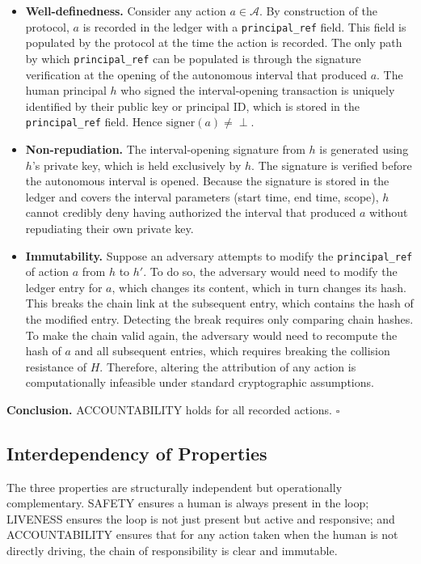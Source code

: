 \begin{itemize}
    \item \textbf{Well-definedness.} Consider any action $a \in \mathcal{A}$. By construction of the protocol, $a$ is recorded in the ledger with a \texttt{principal\_ref} field. This field is populated by the protocol at the time the action is recorded. The only path by which \texttt{principal\_ref} can be populated is through the signature verification at the opening of the autonomous interval that produced $a$. The human principal $h$ who signed the interval-opening transaction is uniquely identified by their public key or principal ID, which is stored in the \texttt{principal\_ref} field. Hence $\text{signer}(a) \neq \perp$.
    \item \textbf{Non-repudiation.} The interval-opening signature from $h$ is generated using $h$'s private key, which is held exclusively by $h$. The signature is verified before the autonomous interval is opened. Because the signature is stored in the ledger and covers the interval parameters (start time, end time, scope), $h$ cannot credibly deny having authorized the interval that produced $a$ without repudiating their own private key.
    \item \textbf{Immutability.} Suppose an adversary attempts to modify the \texttt{principal\_ref} of action $a$ from $h$ to $h'$. To do so, the adversary would need to modify the ledger entry for $a$, which changes its content, which in turn changes its hash. This breaks the chain link at the subsequent entry, which contains the hash of the modified entry. Detecting the break requires only comparing chain hashes. To make the chain valid again, the adversary would need to recompute the hash of $a$ and all subsequent entries, which requires breaking the collision resistance of $H$. Therefore, altering the attribution of any action is computationally infeasible under standard cryptographic assumptions.
\end{itemize}

\medskip
\noindent\textbf{Conclusion.} ACCOUNTABILITY holds for all recorded actions. $\square$

\bigskip

\subsection{Interdependency of Properties}
\label{subsection:interdependence}

The three properties are structurally independent but operationally complementary. SAFETY ensures a human is always present in the loop; LIVENESS ensures the loop is not just present but active and responsive; and ACCOUNTABILITY ensures that for any action taken when the human is not directly driving, the chain of responsibility is clear and immutable.

